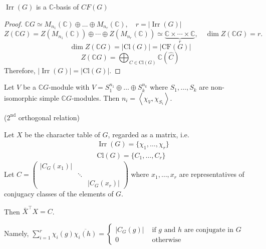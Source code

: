 \documentclass[11pt, a4paper]{report}
\begin{document}
\begin{theorem}
$\operatorname{Irr}(G)$ is a $\mathbb{C}$-basis of $CF(G)$

\end{theorem}
\begin{proof}
$\mathbb{C} G \simeq M_{n_{1}}(\mathbb{C}) \oplus \ldots \oplus M_{n_{r}}(\mathbb{C}), \quad r=|\operatorname{Irr}(G)|$
\[Z(\mathbb{C} G)=Z(M_{n_1}(\mathbb{C})) \oplus \cdots \oplus Z(M_{n_r}(\mathbb{C})) \simeq \underbrace{\mathbb{C} \times \cdots \times \mathbb{C}}_{r}, \quad \dim Z(\mathbb{C} G)=r.\]
\[\dim Z(\mathbb{C} G)=|\mathrm{Cl}(G)|=|\mathrm{CF}(G)|\]
\[Z(\mathbb{C} G)=\bigoplus_{C \in \mathrm{Cl}(G)} \mathbb{C}(\hat{C})\]
Therefore, $|\operatorname{Irr}(G)|=|\mathrm{Cl}(G)|$.
\end{proof}

\begin{corollary}
\end{corollary}

\begin{corollary}
Let $V$ be a $\mathbb{C} G$-module with $V=S_{1}^{n_{1}} \oplus \ldots \oplus S_{k}^{n_{k}}$ where $S_{1}, \ldots, S_{k}$ are non-isomorphic simple $\mathbb{C} G$-modules. Then $n_{i}=\left\langle \chi_{V}, \chi_{S_i}\right\rangle$.
\end{corollary}

\begin{theorem}
($2^{\text{nd}}$ orthogonal relation)

Let $X$ be the character table of $G$, regarded as a matrix, i.e.
\[
\begin{aligned}
& \operatorname{Irr}(G)=\{\chi_{1}, \ldots, \chi_{r}\} \\
& \mathrm{Cl}(G)=\{C_{1}, \ldots, C_{r}\}
\end{aligned}
\]
Let $C=\left(\begin{array}{lll}
\left|C_{G}(x_{1})\right| & & \\
& \ddots & \\
& & \left|C_{G}(x_{r})\right|
\end{array}\right)$ where $x_{1}, \ldots, x_{r}$ are representatives of conjugacy classes of the elements of $G$.

Then $\bar{X}^{\top} X=C$.

Namely, $\sum_{i=1}^{r} \chi_{i}(g) \overline{\chi_{i}(h)}= \begin{cases}\left|C_{G}(g)\right| & \text { if } g \text { and } h \text { are conjugate in } G \\ 0 & \text { otherwise }\end{cases}$
\end{theorem}
\end{document}
